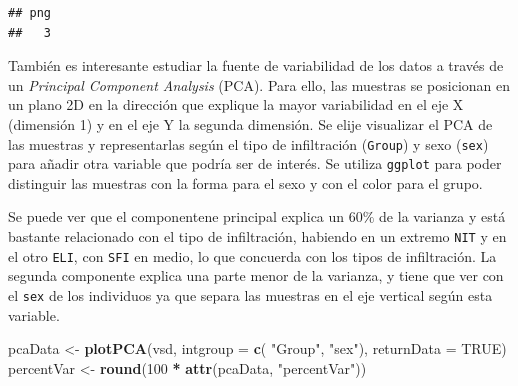\documentclass[
]{article}
\newenvironment{Shaded}{\begin{snugshade}}{\end{snugshade}}
\newcommand{\DataTypeTok}[1]{\textcolor[rgb]{0.13,0.29,0.53}{#1}}
\newcommand{\DecValTok}[1]{\textcolor[rgb]{0.00,0.00,0.81}{#1}}
\newcommand{\KeywordTok}[1]{\textcolor[rgb]{0.13,0.29,0.53}{\textbf{#1}}}
\newcommand{\NormalTok}[1]{#1}
\newcommand{\OperatorTok}[1]{\textcolor[rgb]{0.81,0.36,0.00}{\textbf{#1}}}
\newcommand{\OtherTok}[1]{\textcolor[rgb]{0.56,0.35,0.01}{#1}}
\newcommand{\StringTok}[1]{\textcolor[rgb]{0.31,0.60,0.02}{#1}}
\begin{document}
\begin{verbatim}
## png 
##   3
\end{verbatim}

También es interesante estudiar la fuente de variabilidad de los datos a
través de un \emph{Principal Component Analysis} (PCA). Para ello, las
muestras se posicionan en un plano 2D en la dirección que explique la
mayor variabilidad en el eje X (dimensión 1) y en el eje Y la segunda
dimensión. Se elije visualizar el PCA de las muestras y representarlas
según el tipo de infiltración (\texttt{Group}) y sexo (\texttt{sex})
para añadir otra variable que podría ser de interés. Se utiliza
\texttt{ggplot} para poder distinguir las muestras con la forma para el
sexo y con el color para el grupo.

Se puede ver que el componentene principal explica un \(60\%\) de la
varianza y está bastante relacionado con el tipo de infiltración,
habiendo en un extremo \texttt{NIT} y en el otro \texttt{ELI}, con
\texttt{SFI} en medio, lo que concuerda con los tipos de infiltración.
La segunda componente explica una parte menor de la varianza, y tiene
que ver con el \texttt{sex} de los individuos ya que separa las muestras
en el eje vertical según esta variable.

\begin{Shaded}
\begin{Highlighting}[]
\NormalTok{pcaData <-}\StringTok{ }\KeywordTok{plotPCA}\NormalTok{(vsd, }\DataTypeTok{intgroup =} \KeywordTok{c}\NormalTok{( }\StringTok{"Group"}\NormalTok{, }\StringTok{"sex"}\NormalTok{), }\DataTypeTok{returnData =} \OtherTok{TRUE}\NormalTok{)}
\NormalTok{percentVar <-}\StringTok{ }\KeywordTok{round}\NormalTok{(}\DecValTok{100} \OperatorTok{*}\StringTok{ }\KeywordTok{attr}\NormalTok{(pcaData, }\StringTok{"percentVar"}\NormalTok{))}
\end{Highlighting}
\end{Shaded}
\end{document}
